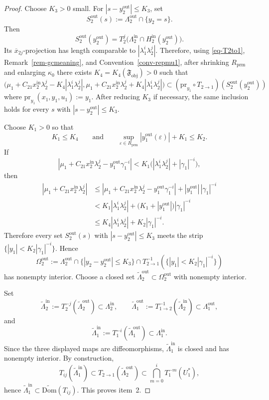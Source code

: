 \documentclass[11pt,a4paper]{article}
\theoremstyle{plain}
\theoremstyle{definition}
\theoremstyle{plain}
\numberwithin{equation}{section}
\begin{document}
\begin{proof}
Choose $K_3 > 0$ small. For $|s - y_2^\mathrm{out}| \le K_3$, set
\[
S_2^\mathrm{out}(s)
:=
\Lambda_2^\mathrm{out} \cap \{y_2 = s\}.
\]
Then
\[
S_2^\mathrm{out}(y_2^\mathrm{out})
=
T_2^j\bigl(\Lambda_2^\mathrm{in} \cap H_2^\mathrm{in}(y_2^\mathrm{out})\bigr).
\]
Its $\overline{x}_{2j}$-projection has length comparable to $|\lambda_1^i\lambda_2^j|$. Therefore, using \eqref{eq-T2to1}, Remark~\ref{rem-gcmeaning}, and Convention~\ref{conv-repmu1}, after shrinking $R_\mathrm{prm}$ and enlarging $\kappa_0$ there exists $K_4 = K_4(\mathfrak{F}_\mathrm{obj}) > 0$ such that
\[
\bigl(
\mu_1 + C_{21}x_2^\mathrm{in}\lambda_2^j - K_4|\lambda_1^i\lambda_2^j|,
\mu_1 + C_{21}x_2^\mathrm{in}\lambda_2^j + K_4|\lambda_1^i\lambda_2^j|
\bigr)
\subset
(\mathrm{pr}_{y_1} \circ T_{2 \to 1})(S_2^\mathrm{out}(y_2^\mathrm{out}))
\]
where $\mathrm{pr}_{y_1}(x_1,y_1,u_1) := y_1$. After reducing $K_3$ if necessary, the same inclusion holds for every $s$ with $|s - y_2^\mathrm{out}| \le K_3$.

Choose $K_1 > 0$ so that
\[
K_1 \le K_4
\qquad\text{and}\qquad
\sup_{\varepsilon \in R_\mathrm{prm}} |y_1^\mathrm{out}(\varepsilon)| + K_1 \le K_2.
\]
If
\[
\left|\mu_1 + C_{21}x_2^\mathrm{in}\lambda_2^j - y_1^\mathrm{out}\gamma_1^{-i}\right|
<
K_1\bigl(|\lambda_1^i\lambda_2^j| + |\gamma_1|^{-i}\bigr),
\]
then
\[
\begin{aligned}
\left|\mu_1 + C_{21}x_2^\mathrm{in}\lambda_2^j\right|
&\le
\left|\mu_1 + C_{21}x_2^\mathrm{in}\lambda_2^j - y_1^\mathrm{out}\gamma_1^{-i}\right|
+
|y_1^\mathrm{out}|\,|\gamma_1|^{-i} \\
&<
K_1|\lambda_1^i\lambda_2^j|
+
\bigl(K_1 + |y_1^\mathrm{out}|\bigr)|\gamma_1|^{-i} \\
&\le
K_4|\lambda_1^i\lambda_2^j| + K_2|\gamma_1|^{-i}.
\end{aligned}
\]
Therefore every set $S_2^\mathrm{out}(s)$ with $|s - y_2^\mathrm{out}| \le K_3$ meets the strip $\{|y_1| < K_2|\gamma_1|^{-i}\}$. Hence
\[
\Omega_2^\mathrm{out}
:=
\Lambda_2^\mathrm{out}
\cap
\{|y_2 - y_2^\mathrm{out}| \le K_3\}
\cap
T_{2 \to 1}^{-1}(\{|y_1| < K_2|\gamma_1|^{-i}\})
\]
has nonempty interior. Choose a closed set $\widetilde{\Lambda}_2^\mathrm{out} \subset \Omega_2^\mathrm{out}$ with nonempty interior.

Set
\[
\widetilde{\Lambda}_2^\mathrm{in}
:=
T_2^{-j}(\widetilde{\Lambda}_2^\mathrm{out}) \subset \Lambda_2^\mathrm{in},
\qquad
\widetilde{\Lambda}_1^\mathrm{out}
:=
T_{1 \to 2}^{-1}(\widetilde{\Lambda}_2^\mathrm{in}) \subset \Lambda_1^\mathrm{out},
\]
and
\[
\widetilde{\Lambda}_1^\mathrm{in}
:=
T_1^{-i}(\widetilde{\Lambda}_1^\mathrm{out}) \subset \Lambda_1^\mathrm{in}.
\]
Since the three displayed maps are diffeomorphisms, $\widetilde{\Lambda}_1^\mathrm{in}$ is closed and has nonempty interior. By construction,
\[
T_{ij}(\widetilde{\Lambda}_1^\mathrm{in})
\subset
T_{2 \to 1}(\widetilde{\Lambda}_2^\mathrm{out})
\subset
\bigcap_{m = 0}^i T_1^{-m}(U_1^*),
\]
hence $\widetilde{\Lambda}_1^\mathrm{in} \subset \widetilde{\mathrm{Dom}}(T_{ij})$. This proves item~2.
\end{proof}
\end{document}
